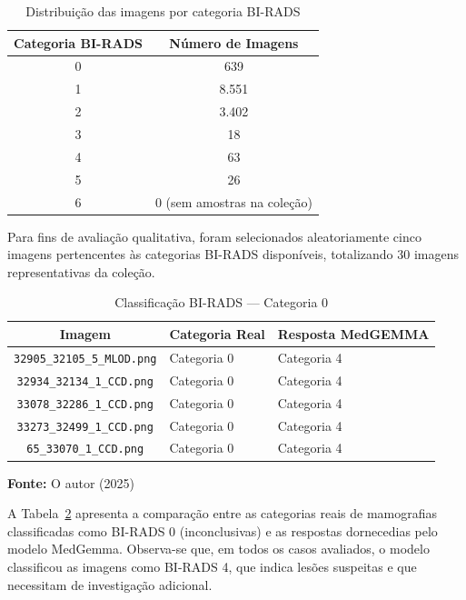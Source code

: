 \documentclass[12pt]{article}
\begin{document}
\begin{table}[!h]
\renewcommand{\arraystretch}{1.3}
\caption{Distribuição das imagens por categoria BI-RADS}
\label{table:distribuicao_birads}
\centering
\begin{tabular}{|c|c|}
\hline
\textbf{Categoria BI-RADS} & \textbf{Número de Imagens} \\
\hline
0 & 639 \\
\hline
1 & 8.551 \\
\hline
2 & 3.402 \\
\hline
3 & 18 \\
\hline
4 & 63 \\
\hline
5 & 26 \\
\hline
6 & 0 (sem amostras na coleção) \\
\hline
\end{tabular}
\end{table}

Para fins de avaliação qualitativa, foram selecionados aleatoriamente cinco imagens pertencentes às categorias BI-RADS disponíveis, totalizando 30 imagens representativas da coleção.
\begin{table}[!h]
\renewcommand{\arraystretch}{1.3}
\caption{Classificação BI-RADS — Categoria 0}
\label{table:birads_categoria0}
\centering
\begin{tabular}{|c|l|p{4.5cm}|}
\hline
\textbf{Imagem} & \textbf{Categoria Real} & \textbf{Resposta MedGEMMA} \\
\hline
\texttt{32905\_32105\_5\_MLOD.png} & Categoria 0 & Categoria 4 \\
\hline
\texttt{32934\_32134\_1\_CCD.png} & Categoria 0 & Categoria 4 \\
\hline
\texttt{33078\_32286\_1\_CCD.png} & Categoria 0 & Categoria 4 \\
\hline
\texttt{33273\_32499\_1\_CCD.png} & Categoria 0 & Categoria 4 \\
\hline
\texttt{65\_33070\_1\_CCD.png} & Categoria 0 & Categoria 4 \\
\hline
\end{tabular}

\vspace{0.2cm}
\small \textbf{Fonte:} O autor (2025)
\end{table}
A Tabela~\ref{table:birads_categoria0} apresenta a comparação entre as categorias reais de mamografias classificadas como BI-RADS 0 (inconclusivas) e as respostas dornecedias pelo modelo MedGemma. Observa-se que, em todos os casos avaliados, o modelo classificou as imagens como BI-RADS 4, que indica lesões suspeitas e que necessitam de investigação adicional.
\end{document}
